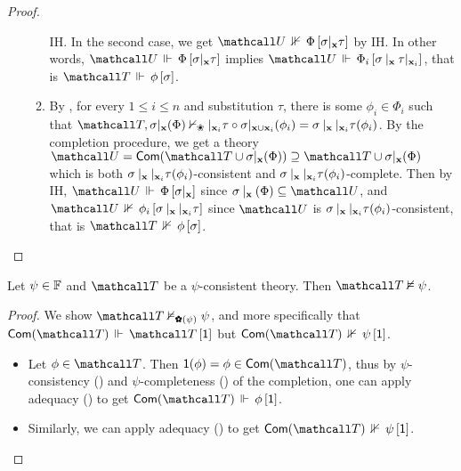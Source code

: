 \begin{proof}
\begin{itemize}
\begin{enumerate}
      IH. In the second case, we get
      $\neforces{\tU}{\Phi}{\restr{\sigma}{\bx}\tau}$ by IH. In other words,
      $\eforces{\tU}{\Phi}{\restr{\sigma}{\bx}\tau}$ implies
      $\eforces{\tU}{\Phi_i}{\update{\update{\sigma}{\bx}{\tau}}{\bx_i}{}}$,
      that is $\eforces{\tT}{\phi}{\sigma}$.
      \item By , for every $1 \leq i \leq n$ and
      substitution $\tau$, there is some $\phi_i \in \Phi_i$ such that $\tT,
      \restr{\sigma}{\bx}(\Phi) \nvdash_\Nature \update{}{\bx_i}{\tau} \circ
      \restr{\sigma}{\bx \cup \bx_i}(\phi_i) =
      \update{\update{\sigma}{\bx}{}}{\bx_i}{\tau}(\phi_i)$. By the completion
      procedure, we get a theory $\tU = \completion{\tT \cup
      \restr{\sigma}{\bx}(\Phi)} \supseteq \tT \cup \restr{\sigma}{\bx}(\Phi)$
      which is both
      $\sigma \mathbin{|_{\mathbf{x}}} \mathbin{|_{\mathbf{x}_i}} \tau(\phi_i)$-consistent and
      $\sigma \mathbin{|_{\mathbf{x}}} \mathbin{|_{\mathbf{x}_i}} \tau(\phi_i)$-complete. Then by
      IH, $\eforces{\tU}{\Phi}{\update{\sigma}{\bx}{}}$ since
      $\update{\sigma}{\bx}{}(\Phi) \subseteq \tU$, and
      $\neforces{\tU}{\phi_i}{\update{\update{\sigma}{\bx}{}}{\bx_i}{\tau}}$
      since $\tU$ is
      $\sigma \mathbin{|_{\mathbf{x}}} \mathbin{|_{\mathbf{x}_i}} \tau(\phi_i)$-consistent, that is
      $\neforces{\tT}{\phi}{\sigma}$.
    \end{enumerate}
  \end{itemize}
\end{proof}

\begin{lemma}
  
  Let $\psi \in \mathbb{F}$ and $\tT$ be a $\psi$-consistent theory. Then $\tT
  \nvDash \psi$.
\end{lemma}
\begin{proof}
  We show $\tT \nvDash_{\rewolF{\psi}} \psi$, and more specifically that
  $\eforces{\completion{\tT}}{\tT}{\idsubst}$ but
  $\neforces{\completion{\tT}}{\psi}{\idsubst}$.
  \begin{itemize}
    \item Let $\phi \in \tT$. Then $\idsubst(\phi) = \phi \in \completion{\tT}$,
    thus by $\psi$-consistency () and
    $\psi$-completeness () of the completion, one
    can apply adequacy () to get
    $\eforces{\completion{\tT}}{\phi}{\idsubst}$.
    \item Similarly, we can apply adequacy () to get
    $\neforces{\completion{\tT}}{\psi}{\idsubst}$.
  \end{itemize}
\end{proof}

